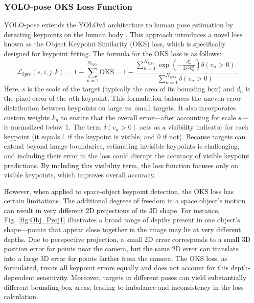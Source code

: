 \documentclass[a4paper,fleqn]{cas-sc}
\begin{document}
\subsubsection{YOLO-pose OKS Loss Function}
YOLO-pose extends the YOLOv5 architecture to human pose estimation by detecting keypoints on the human body \citep{yolo_pose}. This approach introduces a novel loss known as the Object Keypoint Similarity (OKS) loss, which is specifically designed for keypoint fitting. The formula for the OKS loss is as follows:
\begin{equation}
	\mathcal{L}_{kpts}(s, i, j, k) 
    = 1 - \sum_{n=1}^{N_{kpts}} \mathrm{OKS} 
    = 1 - \frac{\sum\limits_{n=1}^{N_{kpts}} \exp \left(-\frac{d_{n}^{2}}{2 s^{2} k_{n}^{2}}\right) \delta\left(v_{n} > 0\right)}{\sum\limits_{n=1}^{N_{kpts}} \delta\left(v_{n} > 0\right)}.
\end{equation}
Here, $s$ is the scale of the target (typically the area of its bounding box) and $d_n$ is the pixel error of the $n$th keypoint. This formulation balances the uneven error distribution between keypoints on large vs. small targets. It also incorporates custom weights $k_n$ to ensure that the overall error—after accounting for scale $s$—is normalized below 1. The term $\delta(v_n > 0)$ acts as a visibility indicator for each keypoint (it equals 1 if the keypoint is visible, and 0 if not). Because targets can extend beyond image boundaries, estimating invisible keypoints is challenging, and including their error in the loss could disrupt the accuracy of visible keypoint predictions. By including this visibility term, the loss function focuses only on visible keypoints, which improves overall accuracy.

However, when applied to space-object keypoint detection, the OKS loss has certain limitations. The additional degrees of freedom in a space object’s motion can result in very different 2D projections of its 3D shape. For instance, Fig.~\ref{fig:Obj_Proj1} illustrates a broad range of depths present in one object’s shape—points that appear close together in the image may lie at very different depths. Due to perspective projection, a small 2D error corresponds to a small 3D position error for points near the camera, but the same 2D error can translate into a large 3D error for points farther from the camera. The OKS loss, as formulated, treats all keypoint errors equally and does not account for this depth-dependent sensitivity. Moreover, targets in different poses can yield substantially different bounding-box areas, leading to imbalance and inconsistency in the loss calculation.
\end{document}
